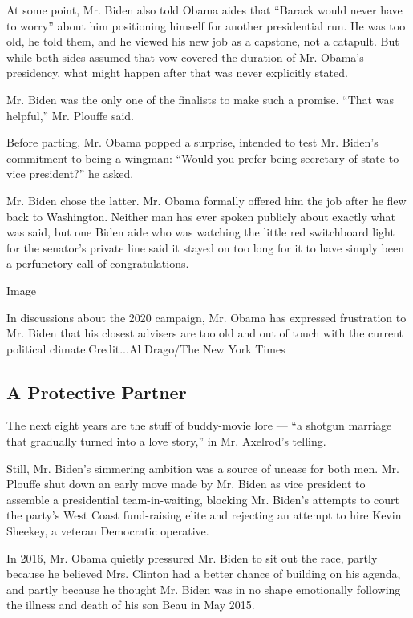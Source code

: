 At some point, Mr. Biden also told Obama aides that ``Barack would never
have to worry'' about him positioning himself for another presidential
run. He was too old, he told them, and he viewed his new job as a
capstone, not a catapult. But while both sides assumed that vow covered
the duration of Mr. Obama's presidency, what might happen after that was
never explicitly stated.

Mr. Biden was the only one of the finalists to make such a promise.
``That was helpful,'' Mr. Plouffe said.

Before parting, Mr. Obama popped a surprise, intended to test Mr.
Biden's commitment to being a wingman: ``Would you prefer being
secretary of state to vice president?'' he asked.

Mr. Biden chose the latter. Mr. Obama formally offered him the job after
he flew back to Washington. Neither man has ever spoken publicly about
exactly what was said, but one Biden aide who was watching the little
red switchboard light for the senator's private line said it stayed on
too long for it to have simply been a perfunctory call of
congratulations.

Image

In discussions about the 2020 campaign, Mr. Obama has expressed
frustration to Mr. Biden that his closest advisers are too old and out
of touch with the current political climate.Credit...Al Drago/The New
York Times

\hypertarget{a-protective-partner}{%
\subsection{A Protective Partner}\label{a-protective-partner}}

The next eight years are the stuff of buddy-movie lore --- ``a shotgun
marriage that gradually turned into a love story,'' in Mr. Axelrod's
telling.

Still, Mr. Biden's simmering ambition was a source of unease for both
men. Mr. Plouffe shut down an early move made by Mr. Biden as vice
president to assemble a presidential team-in-waiting, blocking Mr.
Biden's attempts to court the party's West Coast fund-raising elite and
rejecting an attempt to hire Kevin Sheekey, a veteran Democratic
operative.

In 2016, Mr. Obama quietly pressured Mr. Biden to sit out the race,
partly because he believed Mrs. Clinton had a better chance of building
on his agenda, and partly because he thought Mr. Biden was in no shape
emotionally following the illness and death of his son Beau in May 2015.

